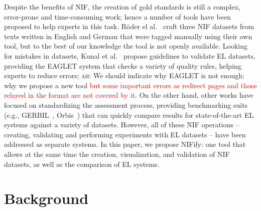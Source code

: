 \documentclass[sigconf]{acmart}
\newcommand{\ah}[1]{{\color{blue}\textsc{ah:} #1}}
\begin{document}
Despite the benefits of NIF, the creation of gold standards is still a complex, error-prone and time-consuming work; hence a number of tools have been proposed to help experts in this task. R\"oder el al.~\cite{N3} craft three NIF datasets from texts written in English and German that were tagged manually using their own tool, but to the best of our knowledge the tool is not openly available. Looking for mistakes in datasets, Kunal et al.~\cite{Kunal2017} propose guidelines to validate EL datasets, providing the EAGLET system that checks a variety of quality rules, helping experts to reduce errors; \ah{We should indicate why EAGLET is not enough: why we propose a new tool} \textcolor{red}{but some important errors as redirect pages and those relayed in the format are not covered by it}. On the other hand, other works have focused on standardizing the assessment process, providing benchmarking suits (e.g., GERBIL~\cite{gerbil-2015}, Orbis~\cite{Orbis2018}) that can quickly compare results for state-of-the-art EL systems against a variety of datasets. However, all of these NIF operations -- creating, validating and performing experiments with EL datasets -- have been addressed as separate systems. In this paper, we propose NIFify: one tool that allows at the same time the creation, visualization, and validation of NIF datasets, as well as the comparison of EL systems. 





\section{Background}
\label{sec:nif}
\end{document}
